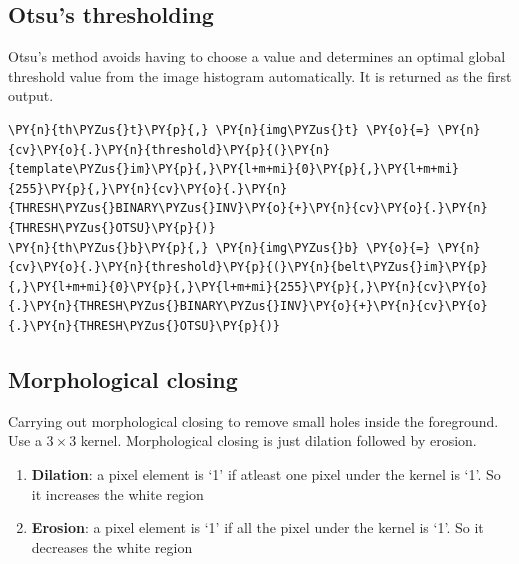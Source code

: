 \documentclass[a4paper,11pt]{article}%
\begin{document}
\hypertarget{otsus-thresholding}{%
\subsection{Otsu's thresholding}\label{otsus-thresholding}}

 Otsu's method avoids having to choose a value and determines an
  optimal global threshold value from the image histogram automatically.
  It is returned as the first output.


    \begin{tcolorbox}[breakable, size=fbox, boxrule=1pt, pad at break*=1mm,colback=cellbackground, colframe=cellborder]
\begin{Verbatim}[commandchars=\\\{\}]
\PY{n}{th\PYZus{}t}\PY{p}{,} \PY{n}{img\PYZus{}t} \PY{o}{=} \PY{n}{cv}\PY{o}{.}\PY{n}{threshold}\PY{p}{(}\PY{n}{template\PYZus{}im}\PY{p}{,}\PY{l+m+mi}{0}\PY{p}{,}\PY{l+m+mi}{255}\PY{p}{,}\PY{n}{cv}\PY{o}{.}\PY{n}{THRESH\PYZus{}BINARY\PYZus{}INV}\PY{o}{+}\PY{n}{cv}\PY{o}{.}\PY{n}{THRESH\PYZus{}OTSU}\PY{p}{)}
\PY{n}{th\PYZus{}b}\PY{p}{,} \PY{n}{img\PYZus{}b} \PY{o}{=} \PY{n}{cv}\PY{o}{.}\PY{n}{threshold}\PY{p}{(}\PY{n}{belt\PYZus{}im}\PY{p}{,}\PY{l+m+mi}{0}\PY{p}{,}\PY{l+m+mi}{255}\PY{p}{,}\PY{n}{cv}\PY{o}{.}\PY{n}{THRESH\PYZus{}BINARY\PYZus{}INV}\PY{o}{+}\PY{n}{cv}\PY{o}{.}\PY{n}{THRESH\PYZus{}OTSU}\PY{p}{)}
\end{Verbatim}
\end{tcolorbox}

    \hypertarget{morphological-closing}{%
\subsection{Morphological closing}\label{morphological-closing}}

Carrying out morphological closing to remove small holes inside the
foreground. Use a $3 \times 3$ kernel. Morphological closing is just dilation followed by erosion.

\begin{enumerate}
\def\labelenumi{\arabic{enumi}.}
\tightlist

\item
\textbf{Dilation}: a pixel element is `1' if atleast one pixel under the kernel
is `1'. So it increases the white region
\item
  \textbf{Erosion}: a pixel element is `1' if all the pixel under the kernel is
  `1'. So it decreases the white region

\end{enumerate}
\end{document}
